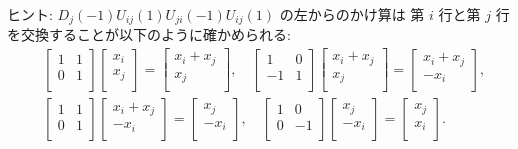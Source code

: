\documentclass[12pt,twoside]{jarticle}
\begin{document}
\noindent
ヒント: $D_j(-1)U_{ij}(1)U_{ji}(-1)U_{ij}(1)$ の左からのかけ算は
第 $i$ 行と第 $j$ 行を交換することが以下のように確かめられる:
\begin{align*}
  &
  \begin{bmatrix}
    1 & 1 \\
    0 & 1 \\
  \end{bmatrix}
  \begin{bmatrix}
    x_i \\
    x_j \\
  \end{bmatrix}
  =
  \begin{bmatrix}
    x_i + x_j \\
    x_j \\
  \end{bmatrix},
  \quad
  \begin{bmatrix}
     1 & 0 \\
    -1 & 1 \\
  \end{bmatrix}
  \begin{bmatrix}
    x_i + x_j \\
    x_j \\
  \end{bmatrix}
  =
  \begin{bmatrix}
    x_i + x_j \\
    -x_i \\
  \end{bmatrix},
  \\ &
  \begin{bmatrix}
    1 & 1 \\
    0 & 1 \\
  \end{bmatrix}
  \begin{bmatrix}
    x_i + x_j \\
    -x_i \\
  \end{bmatrix}
  =
  \begin{bmatrix}
     x_j \\
    -x_i \\
  \end{bmatrix},
  \quad
  \begin{bmatrix}
    1 & 0 \\
    0 & -1 \\
  \end{bmatrix}
  \begin{bmatrix}
     x_j \\
    -x_i \\
  \end{bmatrix}
  =
  \begin{bmatrix}
    x_j \\
    x_i \\
  \end{bmatrix}.
\end{align*}
\end{document}
